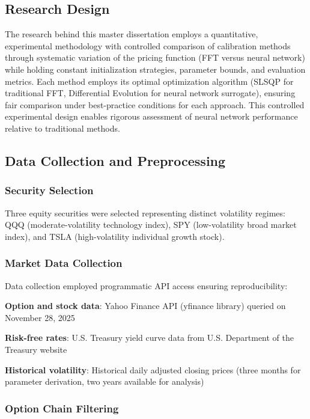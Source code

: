 \documentclass[12pt,a4paper]{article}
\begin{document}
\label{sec:methodology}

\subsection{Research Design}

The research behind this master dissertation employs a quantitative, experimental methodology with controlled comparison of calibration methods through systematic variation of the pricing function (FFT versus neural network) while holding constant initialization strategies, parameter bounds, and evaluation metrics. Each method employs its optimal optimization algorithm (SLSQP for traditional FFT, Differential Evolution for neural network surrogate), ensuring fair comparison under best-practice conditions for each approach. This controlled experimental design enables rigorous assessment of neural network performance relative to traditional methods.

\subsection{Data Collection and Preprocessing}

\subsubsection{Security Selection}

Three equity securities were selected representing distinct volatility regimes: QQQ (moderate-volatility technology index), SPY (low-volatility broad market index), and TSLA (high-volatility individual growth stock).

\subsubsection{Market Data Collection}

Data collection employed programmatic API access ensuring reproducibility:

\textbf{Option and stock data}: Yahoo Finance API (yfinance library) queried on November 28, 2025

\textbf{Risk-free rates}: U.S. Treasury yield curve data from U.S. Department of the Treasury website

\textbf{Historical volatility}: Historical daily adjusted closing prices (three months for parameter derivation, two years available for analysis)

\subsubsection{Option Chain Filtering}
\end{document}
